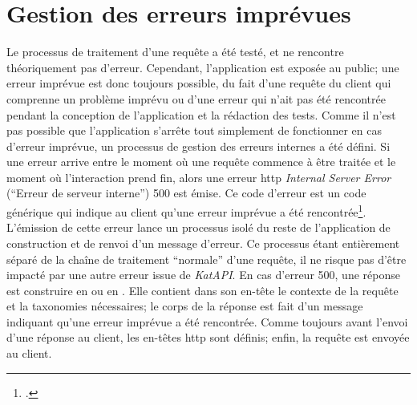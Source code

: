\section{Gestion des erreurs imprévues}
Le processus de traitement d'une requête a été testé, et ne rencontre théoriquement pas d'erreur. Cependant, l'application est exposée au public; une erreur imprévue est donc toujours possible, du fait d'une requête du client qui comprenne un problème imprévu ou d'une erreur qui n'ait pas été rencontrée pendant la conception de l'application et la rédaction des tests. Comme il n'est pas possible que l'application s'arrête tout simplement de fonctionner en cas d'erreur imprévue, un processus de gestion des erreurs internes a été défini. Si une erreur arrive entre le moment où une requête commence à être traitée et le moment où l'interaction prend fin, alors une erreur \gls{http} \textit{Internal Server Error} (\enquote{Erreur de serveur interne}) 500 est émise. Ce code d'erreur est un code générique qui indique au client qu'une erreur imprévue a été rencontrée\footcite[§15.6.1. 500 \textit{Internal Server Error}]{fielding_http_2022}. L'émission de cette erreur lance un processus isolé du reste de l'application de construction et de renvoi d'un message d'erreur. Ce processus étant entièrement séparé de la chaîne de traitement \enquote{normale} d'une requête, il ne risque pas d'être impacté par une autre erreur issue de \textit{KatAPI}. En cas d'erreur 500, une réponse est construire en \tei{} ou en \json{}. Elle contient dans son en-tête le contexte de la requête et la taxonomies nécessaires; le corps de la réponse est fait d'un message indiquant qu'une erreur imprévue a été rencontrée. Comme toujours avant l'envoi d'une réponse au client, les en-têtes \gls{http} sont définis; enfin, la requête est envoyée au client.

